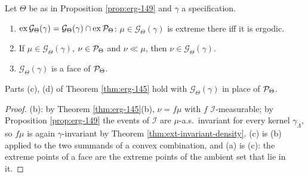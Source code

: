 \begin{theorem}[Georgii (14.15)]
    \label{thm:erg-1415}
    \leanok

    Let $\Theta$ be as in Proposition \ref{prop:erg-149} and $\gamma$ a specification.
    \begin{enumerate}
        \item[(a)] $\mathrm{ex}\,\mathcal{G}_\Theta(\gamma) = \mathcal{G}_\Theta(\gamma) \cap
              \mathrm{ex}\,\mathcal{P}_\Theta$: $\mu \in \mathcal{G}_\Theta(\gamma)$ is extreme there
              iff it is ergodic.
        \item[(b)] If $\mu \in \mathcal{G}_\Theta(\gamma)$, $\nu \in \mathcal{P}_\Theta$ and
              $\nu \ll \mu$, then $\nu \in \mathcal{G}_\Theta(\gamma)$.
        \item[(c)] $\mathcal{G}_\Theta(\gamma)$ is a face of $\mathcal{P}_\Theta$.
    \end{enumerate}
    Parts (c), (d) of Theorem \ref{thm:erg-145} hold with $\mathcal{G}_\Theta(\gamma)$ in place
    of $\mathcal{P}_\Theta$.
\end{theorem}
\begin{proof}
    \leanok

    (b): by Theorem \ref{thm:erg-145}(b), $\nu = f\mu$ with $f$ $\mathcal{I}$-measurable; by
    Proposition \ref{prop:erg-149} the events of $\mathcal{I}$ are $\mu$-a.s.\ invariant for
    every kernel $\gamma_\Lambda$, so $f\mu$ is again $\gamma$-invariant by
    Theorem \ref{thm:ext-invariant-density}. (c) is (b) applied to the two summands of a convex
    combination, and (a) is (c): the extreme points of a face are the extreme points of the
    ambient set that lie in it.
\end{proof}

